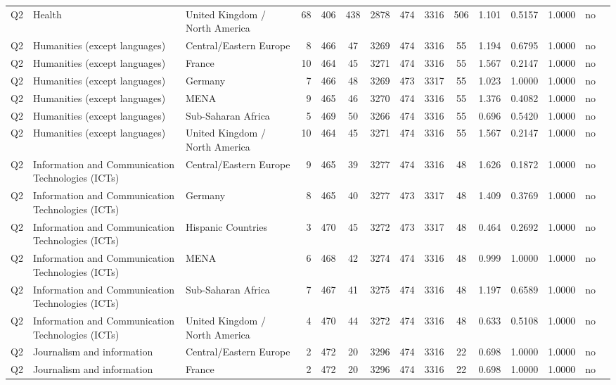 \begin{longtable}{lllrcccccccccll}
Q2 & Health & United Kingdom / North America & 68 & 406 & 438 & 2878 & 474 & 3316 & 506 & 1.101 & 0.5157 & 1.0000 & no \\
Q2 & Humanities (except languages) & Central/Eastern Europe & 8 & 466 & 47 & 3269 & 474 & 3316 & 55 & 1.194 & 0.6795 & 1.0000 & no \\
Q2 & Humanities (except languages) & France & 10 & 464 & 45 & 3271 & 474 & 3316 & 55 & 1.567 & 0.2147 & 1.0000 & no \\
Q2 & Humanities (except languages) & Germany & 7 & 466 & 48 & 3269 & 473 & 3317 & 55 & 1.023 & 1.0000 & 1.0000 & no \\
Q2 & Humanities (except languages) & MENA & 9 & 465 & 46 & 3270 & 474 & 3316 & 55 & 1.376 & 0.4082 & 1.0000 & no \\
Q2 & Humanities (except languages) & Sub-Saharan Africa & 5 & 469 & 50 & 3266 & 474 & 3316 & 55 & 0.696 & 0.5420 & 1.0000 & no \\
Q2 & Humanities (except languages) & United Kingdom / North America & 10 & 464 & 45 & 3271 & 474 & 3316 & 55 & 1.567 & 0.2147 & 1.0000 & no \\
Q2 & Information and Communication Technologies (ICTs) & Central/Eastern Europe & 9 & 465 & 39 & 3277 & 474 & 3316 & 48 & 1.626 & 0.1872 & 1.0000 & no \\
Q2 & Information and Communication Technologies (ICTs) & Germany & 8 & 465 & 40 & 3277 & 473 & 3317 & 48 & 1.409 & 0.3769 & 1.0000 & no \\
Q2 & Information and Communication Technologies (ICTs) & Hispanic Countries & 3 & 470 & 45 & 3272 & 473 & 3317 & 48 & 0.464 & 0.2692 & 1.0000 & no \\
Q2 & Information and Communication Technologies (ICTs) & MENA & 6 & 468 & 42 & 3274 & 474 & 3316 & 48 & 0.999 & 1.0000 & 1.0000 & no \\
Q2 & Information and Communication Technologies (ICTs) & Sub-Saharan Africa & 7 & 467 & 41 & 3275 & 474 & 3316 & 48 & 1.197 & 0.6589 & 1.0000 & no \\
Q2 & Information and Communication Technologies (ICTs) & United Kingdom / North America & 4 & 470 & 44 & 3272 & 474 & 3316 & 48 & 0.633 & 0.5108 & 1.0000 & no \\
Q2 & Journalism and information & Central/Eastern Europe & 2 & 472 & 20 & 3296 & 474 & 3316 & 22 & 0.698 & 1.0000 & 1.0000 & no \\
Q2 & Journalism and information & France & 2 & 472 & 20 & 3296 & 474 & 3316 & 22 & 0.698 & 1.0000 & 1.0000 & no \\

\end{longtable}
